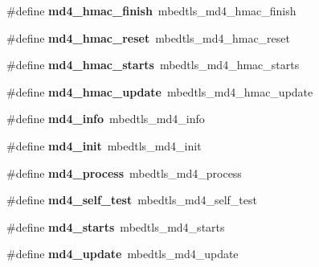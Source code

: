 \begin{DoxyCompactItemize}
\mbox{\label{compat-1_83_8h_a6965abc90683bdf8502f877d02201832}} 
\#define {\bfseries md4\+\_\+hmac\+\_\+finish}~mbedtls\+\_\+md4\+\_\+hmac\+\_\+finish
\item 
\mbox{\label{compat-1_83_8h_af50dbaacf830198d714ec2847fbfb026}} 
\#define {\bfseries md4\+\_\+hmac\+\_\+reset}~mbedtls\+\_\+md4\+\_\+hmac\+\_\+reset
\item 
\mbox{\label{compat-1_83_8h_a6eea064bac6382ef510fc0d0a58dd974}} 
\#define {\bfseries md4\+\_\+hmac\+\_\+starts}~mbedtls\+\_\+md4\+\_\+hmac\+\_\+starts
\item 
\mbox{\label{compat-1_83_8h_aa6cb1ae0d63cd39e11c206df6448240d}} 
\#define {\bfseries md4\+\_\+hmac\+\_\+update}~mbedtls\+\_\+md4\+\_\+hmac\+\_\+update
\item 
\mbox{\label{compat-1_83_8h_abc205cf794a0341577e3a0f79f1f7a7e}} 
\#define {\bfseries md4\+\_\+info}~mbedtls\+\_\+md4\+\_\+info
\item 
\mbox{\label{compat-1_83_8h_a256b85df593d411ae557fe193ddf6587}} 
\#define {\bfseries md4\+\_\+init}~mbedtls\+\_\+md4\+\_\+init
\item 
\mbox{\label{compat-1_83_8h_ab001f08d9f3590cec7ab0c661fa74f1f}} 
\#define {\bfseries md4\+\_\+process}~mbedtls\+\_\+md4\+\_\+process
\item 
\mbox{\label{compat-1_83_8h_aa1337467e10223798819278047bde91a}} 
\#define {\bfseries md4\+\_\+self\+\_\+test}~mbedtls\+\_\+md4\+\_\+self\+\_\+test
\item 
\mbox{\label{compat-1_83_8h_aef321d58e14aaf969ac99814a8de12be}} 
\#define {\bfseries md4\+\_\+starts}~mbedtls\+\_\+md4\+\_\+starts
\item 
\mbox{\label{compat-1_83_8h_a0e08aa0a6d65b1563e355f17fbf1afe7}} 
\#define {\bfseries md4\+\_\+update}~mbedtls\+\_\+md4\+\_\+update
\item 
\mbox{\label{compat-1_83_8h_a0afe2b38aad3922dbc2d396b8af03d60}} 

\end{DoxyCompactItemize}
